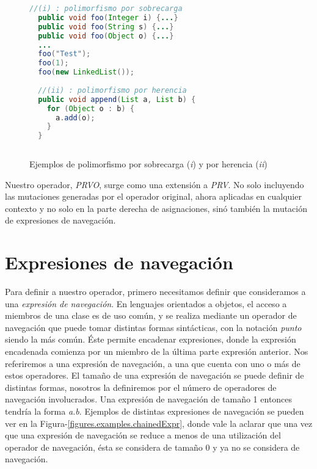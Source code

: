 \begin{figure}
	\begin{lstlisting}[mathescape=true, language=Java, extendedchars=true]
  //(i) : polimorfismo por sobrecarga
  public void foo(Integer i) {...}
  public void foo(String s) {...}
  public void foo(Object o) {...}
  ...
  foo("Test");
  foo(1);
  foo(new LinkedList());
  
  //(ii) : polimorfismo por herencia
  public void append(List a, List b) {
    for (Object o : b) {
      a.add(o);
    }
  }
  
	\end{lstlisting}
	\caption{Ejemplos de polimorfismo por sobrecarga (\emph{i}) y por herencia (\emph{ii})}
	\label{figures.examples.polimorfism}
\end{figure}

Nuestro operador, \emph{PRVO}, surge como una extensi\'on a \emph{PRV}. No solo incluyendo las mutaciones generadas por el operador original, ahora aplicadas en cualquier contexto y no solo en la parte derecha de asignaciones, sin\'o tambi\'en la mutaci\'on de expresiones de navegaci\'on.


\section{Expresiones de navegaci\'on}
\label{sec:prvo.navigationalExpressions}

Para definir a nuestro operador, primero necesitamos definir que consideramos a una \emph{expresi\'on de navegaci\'on}. En lenguajes orientados a objetos, el acceso a miembros de una clase es de uso com\'un, y se realiza mediante un operador de navegaci\'on que puede tomar distintas formas sint\'acticas, con la notaci\'on \emph{punto} siendo la m\'as com\'un. \'Este permite encadenar expresiones, donde la expresi\'on encadenada comienza por un miembro de la \'ultima parte expresi\'on anterior. Nos referiremos a una expresi\'on de navegaci\'on, a una que cuenta con uno o m\'as de estos operadores. El tama\~no de una expresi\'on de navegaci\'on se puede definir de distintas formas, nosotros la definiremos por el n\'umero de operadores de navegaci\'on involucrados. Una expresi\'on de navegaci\'on de tama\~no 1 entonces tendr\'ia la forma \emph{a.b}. Ejemplos de distintas expresiones de navegaci\'on se pueden ver en la Figura-\ref{figures.examples.chainedExpr}, donde vale la aclarar que una vez que una expresi\'on de navegaci\'on se reduce a menos de una utilizaci\'on del operador de navegaci\'on, \'esta se considera de tama\~no 0 y ya no se considera de navegaci\'on.

